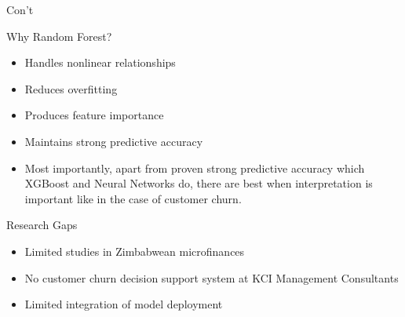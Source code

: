 \documentclass[10pt]{beamer}
\begin{document}
\begin{frame}{Con't}
	
	\small
			
	\begin{exampleblock}{Why Random Forest?}
		\begin{itemize}
			\item Handles nonlinear relationships
			
			\item Reduces overfitting
			
			\item Produces feature importance
			
			\item Maintains strong predictive accuracy
			\item Most importantly, apart from proven strong predictive accuracy which XGBoost and Neural Networks do, there are best when interpretation is important like in the case of customer churn.
		\end{itemize}
	\end{exampleblock}
	
	
		\begin{alertblock}{Research Gaps}
			\begin{itemize}
				\item Limited studies in Zimbabwean microfinances
				\item No customer churn decision support system at KCI Management Consultants
				
				\item Limited integration of model deployment
			\end{itemize}
		\end{alertblock}
		
	
	
	\vspace{0.2cm}
	

\end{frame}
	
	
	
\end{document}
